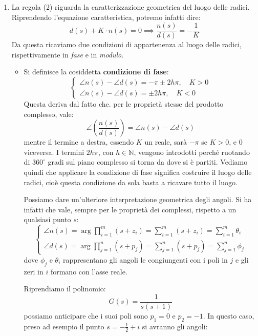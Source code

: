\documentclass[a4paper,11pt]{article}
\begin{document}
\begin{enumerate}
	\item	
		La regola (2) riguarda la caratterizzazione geometrica del luogo delle radici. Riprendendo l'equazione caratteristica, potremo infatti dire:
		$$
		d(s) + K \cdot n(s) = 0 \implies \frac{n(s)}{d(s)} = -\frac{1}{K}
		$$
		Da questa ricaviamo due condizioni di appartenenza al luogo delle radici, rispettivamente in \textit{fase} e in \textit{modulo}.
		\begin{itemize}
			\item 
				Si definisce la cosiddetta \textbf{condizione di fase}:
				\[
					\begin{cases}
						\angle n(s) - \angle d(s) = -\pi \pm 2 h \pi, \quad K > 0 \\
						\angle n(s) - \angle d(s) = \pm 2 h \pi, \quad K < 0
					\end{cases}
				\]
				Questa deriva dal fatto che. per le proprietà stesse del prodotto complesso, vale:
				$$
				\angle \left( \frac{n(s)}{d(s)} \right) = \angle n(s) - \angle d(s)
				$$
				mentre il termine a destra, essendo $K$ un reale, sarà $-\pi$ se $K > 0$, e $0$ viceversa.
				I termini $2 h \pi$, con $h \in \mathbb{N}$, vengono introdotti perché ruotando di $360^\circ$ gradi sul piano complesso si torna da dove si è partiti.
				Vediamo quindi che applicare la condizione di fase significa costruire il luogo delle radici, cioè questa condizione da sola basta a ricavare tutto il luogo.

				Possiamo dare un'ulteriore interpretazione geometrica degli angoli.
				Si ha infatti che vale, sempre per le proprietà dei complessi, rispetto a un qualsiasi punto $s$:
				\[
					\begin{cases}
						\angle n(s) = \arg \prod_{i = 1}^m (s + z_i) = \sum_{i = 1}^m (s + z_i) = \sum_{i = 1}^m \theta_i \\ 
						\angle d(s) = \arg \prod_{j = 1}^n (s + p_j) = \sum_{j = 1}^n (s + p_j) = \sum_{j = 1}^n \phi_j 
					\end{cases}
				\]
				dove $\phi_j$ e $\theta_i$ rappresentano gli angoli le congiungenti con i poli in $j$ e gli zeri in $i$ formano con l'asse reale. 

				\par\medskip
				\noindent
				\textbf{}

				Riprendiamo il polinomio:
				$$
				G(s) = \frac{1}{s (s + 1)}
				$$
				possiamo anticipare che i suoi poli sono $p_1 = 0$ e $p_2 = -1$.
				In questo caso, preso ad esempio il punto $s = -\frac{1}{2} + i$ si avranno gli angoli:


\end{itemize}
\end{enumerate}
\end{document}
